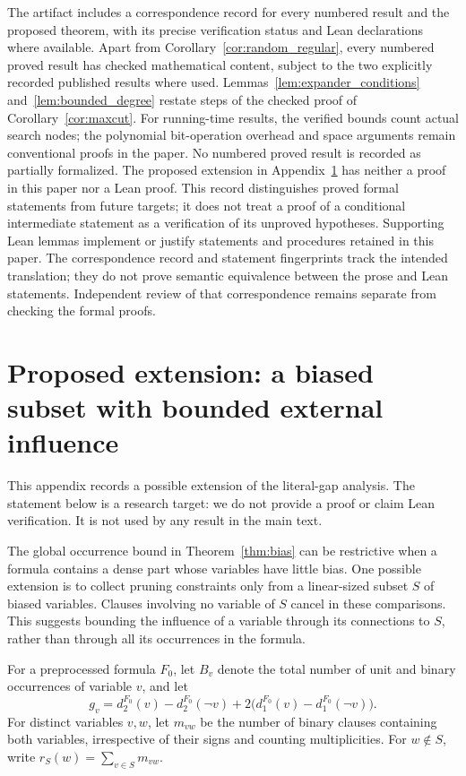 \documentclass[11pt,a4paper]{article}
\theoremstyle{definition}
\theoremstyle{remark}
\begin{document}
The artifact includes a correspondence record for every numbered result
and the proposed theorem,
with its precise verification status and Lean declarations where available.
Apart from Corollary~\ref{cor:random_regular}, every numbered proved result
has checked mathematical content, subject to the two explicitly recorded
published results where used. Lemmas~\ref{lem:expander_conditions}
and~\ref{lem:bounded_degree} restate steps of the checked proof of
Corollary~\ref{cor:maxcut}.
For running-time results, the verified bounds count actual search nodes;
the polynomial bit-operation overhead and space arguments remain
conventional proofs in the paper. No numbered proved result is recorded
as partially formalized.
The proposed extension in Appendix~\ref{app:biased_subset}
has neither a proof in this paper nor a Lean proof.
This record distinguishes proved formal statements from future targets;
it does not treat a proof of a conditional intermediate statement as a
verification of its unproved hypotheses. Supporting Lean lemmas implement
or justify statements and procedures retained in this paper.
The correspondence record and statement fingerprints track the intended
translation; they do not prove semantic equivalence between the prose
and Lean statements. Independent review of that correspondence remains
separate from checking the formal proofs.

\section{Proposed extension: a biased subset with bounded external influence}
\label{app:biased_subset}

This appendix records a possible extension of the literal-gap analysis.
The statement below is a research target: we do not provide a proof or
claim Lean verification. It is not used by any result in the main text.

The global occurrence bound in Theorem~\ref{thm:bias} can be restrictive
when a formula contains a dense part whose variables have little bias.
One possible extension is to collect pruning constraints only from a
linear-sized subset $S$ of biased variables. Clauses involving no variable
of $S$ cancel in these comparisons. This suggests bounding the influence
of a variable through its connections to $S$, rather than through all
its occurrences in the formula.

For a preprocessed formula $F_0$, let $B_v$ denote the total number of
unit and binary occurrences of variable $v$, and let
\[
 g_v=d_2^{F_0}(v)-d_2^{F_0}(\neg v)
       +2\bigl(d_1^{F_0}(v)-d_1^{F_0}(\neg v)\bigr).
\]
For distinct variables $v,w$, let $m_{vw}$ be the number of binary
clauses containing both variables, irrespective of their signs and
counting multiplicities. For $w\notin S$, write
$r_S(w)=\sum_{v\in S}m_{vw}$.
\end{document}
